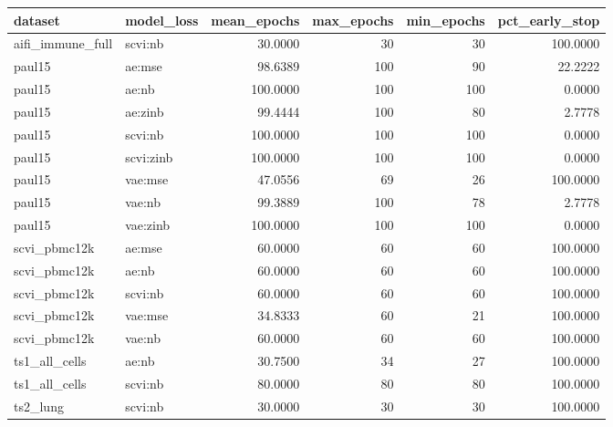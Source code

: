 \begin{tabular}{llrrrr}
\toprule
dataset & model\_loss & mean\_epochs & max\_epochs & min\_epochs & pct\_early\_stop \\
\midrule
aifi\_immune\_full & scvi:nb & 30.0000 & 30 & 30 & 100.0000 \\
paul15 & ae:mse & 98.6389 & 100 & 90 & 22.2222 \\
paul15 & ae:nb & 100.0000 & 100 & 100 & 0.0000 \\
paul15 & ae:zinb & 99.4444 & 100 & 80 & 2.7778 \\
paul15 & scvi:nb & 100.0000 & 100 & 100 & 0.0000 \\
paul15 & scvi:zinb & 100.0000 & 100 & 100 & 0.0000 \\
paul15 & vae:mse & 47.0556 & 69 & 26 & 100.0000 \\
paul15 & vae:nb & 99.3889 & 100 & 78 & 2.7778 \\
paul15 & vae:zinb & 100.0000 & 100 & 100 & 0.0000 \\
scvi\_pbmc12k & ae:mse & 60.0000 & 60 & 60 & 100.0000 \\
scvi\_pbmc12k & ae:nb & 60.0000 & 60 & 60 & 100.0000 \\
scvi\_pbmc12k & scvi:nb & 60.0000 & 60 & 60 & 100.0000 \\
scvi\_pbmc12k & vae:mse & 34.8333 & 60 & 21 & 100.0000 \\
scvi\_pbmc12k & vae:nb & 60.0000 & 60 & 60 & 100.0000 \\
ts1\_all\_cells & ae:nb & 30.7500 & 34 & 27 & 100.0000 \\
ts1\_all\_cells & scvi:nb & 80.0000 & 80 & 80 & 100.0000 \\
ts2\_lung & scvi:nb & 30.0000 & 30 & 30 & 100.0000 \\
\bottomrule
\end{tabular}
